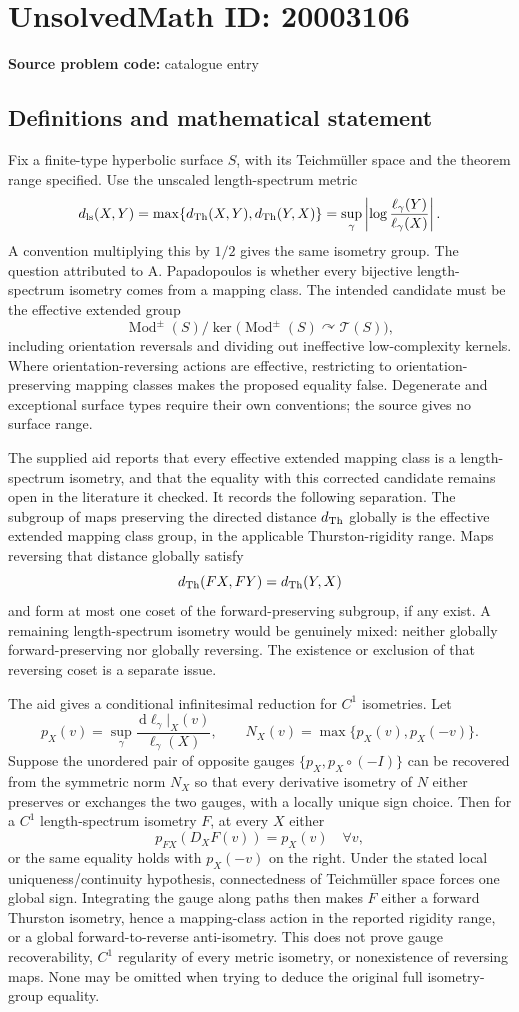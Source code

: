 \documentclass[11pt]{article}
\newcommand{\dd}{\,\mathrm{d}}
\begin{document}
\section*{UnsolvedMath ID: 20003106}
\textbf{Source problem code:} catalogue entry
\subsection{Definitions and mathematical statement}
Fix a finite-type hyperbolic surface \(S\), with its Teichm\"uller space and the theorem range specified. Use the unscaled length-spectrum metric
\[
d_{\rm ls}(X,Y)=\max\{d_{\rm Th}(X,Y),d_{\rm Th}(Y,X)\}
=\sup_\gamma\left|\log\frac{\ell_\gamma(Y)}{\ell_\gamma(X)}\right|.
\]
A convention multiplying this by \(1/2\) gives the same isometry group. The question attributed to A. Papadopoulos is whether every bijective length-spectrum isometry comes from a mapping class. The intended candidate must be the effective extended group
\[
\operatorname{Mod}^{\pm}(S)/\ker\bigl(\operatorname{Mod}^{\pm}(S)\curvearrowright\mathcal T(S)\bigr),
\]
including orientation reversals and dividing out ineffective low-complexity kernels. Where orientation-reversing actions are effective, restricting to orientation-preserving mapping classes makes the proposed equality false. Degenerate and exceptional surface types require their own conventions; the source gives no surface range.

The supplied aid reports that every effective extended mapping class is a length-spectrum isometry, and that the equality with this corrected candidate remains open in the literature it checked. It records the following separation. The subgroup of maps preserving the directed distance \(d_{\rm Th}\) globally is the effective extended mapping class group, in the applicable Thurston-rigidity range. Maps reversing that distance globally satisfy
\[
d_{\rm Th}(FX,FY)=d_{\rm Th}(Y,X)
\]
and form at most one coset of the forward-preserving subgroup, if any exist. A remaining length-spectrum isometry would be genuinely mixed: neither globally forward-preserving nor globally reversing. The existence or exclusion of that reversing coset is a separate issue.

The aid gives a conditional infinitesimal reduction for \(C^1\) isometries. Let
\[
p_X(v)=\sup_\gamma\frac{\dd\ell_\gamma|_X(v)}{\ell_\gamma(X)},\qquad
N_X(v)=\max\{p_X(v),p_X(-v)\}.
\]
Suppose the unordered pair of opposite gauges \(\{p_X,p_X\circ(-I)\}\) can be recovered from the symmetric norm \(N_X\) so that every derivative isometry of \(N\) either preserves or exchanges the two gauges, with a locally unique sign choice. Then for a \(C^1\) length-spectrum isometry \(F\), at every \(X\) either
\[
p_{FX}(D_XF(v))=p_X(v)\quad\forall v,
\]
or the same equality holds with \(p_X(-v)\) on the right. Under the stated local uniqueness/continuity hypothesis, connectedness of Teichm\"uller space forces one global sign. Integrating the gauge along paths then makes \(F\) either a forward Thurston isometry, hence a mapping-class action in the reported rigidity range, or a global forward-to-reverse anti-isometry. This does not prove gauge recoverability, \(C^1\) regularity of every metric isometry, or nonexistence of reversing maps. None may be omitted when trying to deduce the original full isometry-group equality.
\end{document}
